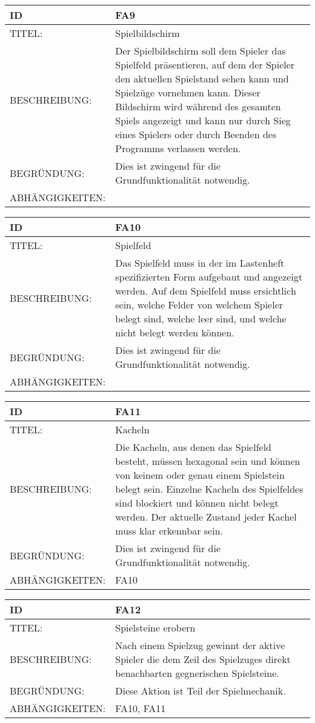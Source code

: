 \documentclass{uulm-assignment}
\begin{document}
\begin{tabularx}{16cm}{l|X}
\textbf{ID} & \textbf{FA9} \\
\hline
TITEL: & Spielbildschirm \\
\hline
BESCHREIBUNG: & Der Spielbildschirm soll dem Spieler das Spielfeld präsentieren, auf dem der Spieler den aktuellen Spielstand sehen kann und Spielzüge vornehmen kann.
Dieser Bildschirm wird während des gesamten Spiels angezeigt und kann nur durch Sieg eines Spielers oder durch Beenden des Programms verlassen werden. 
\\
\hline
BEGRÜNDUNG: & Dies ist zwingend für die Grundfunktionalität notwendig.\\
\hline
ABHÄNGIGKEITEN: & \\
\end{tabularx}

\begin{tabularx}{16cm}{l|X}
\textbf{ID} & \textbf{FA10} \\
\hline
TITEL: & Spielfeld \\
\hline
BESCHREIBUNG: & Das Spielfeld muss in der im Lastenheft spezifizierten Form aufgebaut und angezeigt werden.
Auf dem Spielfeld muss ersichtlich sein, welche Felder von welchem Spieler belegt sind, welche leer sind, und welche nicht belegt werden können.
\\
\hline
BEGRÜNDUNG: & Dies ist zwingend für die Grundfunktionalität notwendig. \\
\hline
ABHÄNGIGKEITEN: & \\
\end{tabularx}


\begin{tabularx}{16cm}{l|X}
\textbf{ID} & \textbf{FA11} \\
\hline
TITEL: & Kacheln\\
\hline
BESCHREIBUNG: & Die Kacheln, aus denen das Spielfeld besteht, müssen hexagonal sein und können
von keinem oder genau einem Spielstein belegt sein. Einzelne Kacheln des Spielfeldes sind blockiert und können nicht belegt werden. Der aktuelle Zustand jeder Kachel muss klar erkennbar sein.
\\
\hline
BEGRÜNDUNG: & Dies ist zwingend für die Grundfunktionalität notwendig. \\
\hline
ABHÄNGIGKEITEN: & FA10 \\
\end{tabularx}

\begin{tabularx}{16cm}{l|X}
\textbf{ID} & \textbf{FA12} \\
\hline
TITEL: & Spielsteine erobern \\
\hline
BESCHREIBUNG: & Nach einem Spielzug gewinnt der aktive Spieler die dem Zeil des Spielzuges direkt benachbarten gegnerischen Spielsteine.
\\
\hline
BEGRÜNDUNG: & Diese Aktion ist Teil der Spielmechanik. \\
\hline
ABHÄNGIGKEITEN: & FA10, FA11\\
\end{tabularx}
\end{document}

